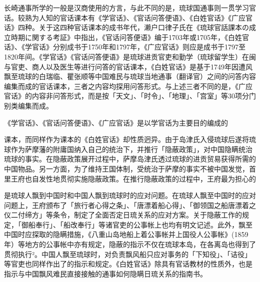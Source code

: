 长崎通事所学的一般是汉商使用的方言，与此不同的是，琉球国通事则一贯学习官话。较熟为人知的官话课本有《学官话》、《官话问答便语》、《白姓官话》《广应官话》四种。关于这四种官话课本的成书年代，濑户口律子氏在《琉球官話課本の成立時期に関する考証》中指出，《官话问答便语》编于1703年或1705年，《白姓官话》、《学官话》分别成书于1750年和1797年，《广应官话》则应是成书于1797至1820年间。《学官话》《官话问答便语》是琉球进贡官吏和勤学（琉球留学生）在闽与官吏、商人以及医生等进行问答的官话课本，《白姓官话》是基于1749年因遭风飘至琉球的白瑞临、瞿张顺等中国难民与琉球当地通事（翻译官）之间的问答内容编集而成的官话课本，三者之内容均探用问答形式。与上述三者不同的是，《广应官话》的内容非问答形式，而是按「天文」、「时令」、「地理」、「宫室」等30项分门别类编集而成。

\begin{BookQuote}
《学官话》、《官话问答便语》、《广应官话》是以学官话为主要目的编成的
\end{BookQuote}

课本，而同样作为课本的《白姓官话》却性质迥异。由于岛津氏入侵琉球后遂将琉球作为萨摩藩的附庸国纳入自己的统治下，并推行「隐蔽政策」，对中国隐瞒统治琉球的事实。在隐蔽政策展开过程中，萨摩岛津氏透过琉球的进贡贸易获得所需的中国物品。另一方面，为了维持王国体制，受统治于萨摩的事实不被中国发觉，首里王府也自发性地贯彻实施隐蔽政策。在推行隐蔽政策的过程中，王府最为担心的

\vfill
\begin{BookNotes}
\end{BookNotes}

\noindent 是琉球人飘到中国时和中国人飘到琉球时的应对问题。在琉球人飘至中国时的应对问题上，王府颁布了「旅行者心得之条」、「唐漂着船心得」、「御领国之船唐漂着之仪二付缔方」等条令，制定了全面否定日琉关系的应对方案。关于隐蔽工作的规定，「御船奉行」、「船改奉行」等诸官吏的公事帐上也均有明文记述。此外，飘至中国时应探取的隐瞒措施，《八重山岛地船上着公事帐并上国役人公事帐》(1859年）等地方的公事帐中亦有规定，隐蔽的指示不仅在琉球本岛，在各离岛也得到了贯彻执行²。中国人飘至琉球时，对负责飘风船只应对事务的「下知役」、「诘役」等官吏也同样作出了的指示和规定。《白姓官话》除具有官话教材的性质外，也是指示与中国飘风难民直接接触的通事如何隐瞒日琉关系的指南书。


